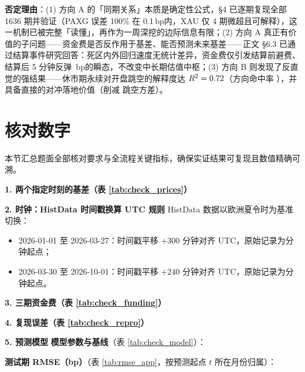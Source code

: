 \documentclass[UTF8,zihao=5,a4paper]{ctexart}
\newcommand{\key}[1]{\textbf{#1}}
\newcommand{\bp}{\ensuremath{\,\mathrm{bp}}}
\begin{document}
{\noindent\textbf{否定理由}：(1) 方向 A 的「同期关系」本质是确定性公式，§4 已逐期复现全部 1636 期并验证（PAXG 误差 100\% 在 0.1\bp 内，XAU 仅 4 期微超且可解释），这一机制已被完整「读懂」，再作为一周深挖的边际信息有限；(2) 方向 A 真正有价值的子问题——资金费是否反作用于基差、能否预测未来基差——正文 §6.3 已通过结算事件研究回答：死区内外回归速度无统计差异，资金费仅引发结算前避费、结算后 5 分钟反弹 \evUpJump\bp 的瞬态，不改变中长期估值中枢；(3) 方向 B 则发现了反直觉的强结果——休市期永续对开盘跳空的解释度达 $R^2=0.72$（方向命中率 \clWkPosthit），并具备直接的对冲落地价值（削减 \clVarCut 跳空方差）。
}

\clearpage
{\linespread{1.08}\selectfont
\setlength{\parskip}{3pt plus 0.6pt minus 0.5pt}
\section{核对数字}
本节汇总题面全部核对要求与全流程关键指标，确保实证结果可复现且数值精确可溯。

\key{1. 两个指定时刻的基差（表 \ref{tab:check_prices}）}
\begin{table}[H]\centering\normalsize
\renewcommand{\arraystretch}{1.32}
\caption{指定时间点收盘价与基差核对}\label{tab:check_prices}

\end{table}

\key{2. 时钟：HistData 时间戳换算 UTC 规则}
HistData 数据以欧洲夏令时为基准切换：
\begin{itemize}[leftmargin=1.5em,itemsep=3pt]
\item 2026-01-01 至 2026-03-27：时间戳平移 $+300$ 分钟对齐 UTC，原始记录为分钟起点；
\item 2026-03-30 至 2026-10-01：时间戳平移 $+240$ 分钟对齐 UTC，原始记录为分钟起点。
\end{itemize}

\key{3. 三期资金费（表 \ref{tab:check_funding}）}
\begin{table}[H]\centering\normalsize
\renewcommand{\arraystretch}{1.32}
\caption{指定结算期资金费率复现对比}\label{tab:check_funding}

\end{table}

\key{4. 复现误差（表 \ref{tab:check_repro}）}
\begin{table}[H]\centering\normalsize
\renewcommand{\arraystretch}{1.32}
\caption{全周期资金费复现误差}\label{tab:check_repro}

\end{table}

\key{5. 预测模型}
\noindent\textbf{模型参数与基线}（表 \ref{tab:check_model}）：
\begin{table}[H]\centering\normalsize
\renewcommand{\arraystretch}{1.32}
\caption{训练/测试样本数与基线回归参数}\label{tab:check_model}

\end{table}
\noindent\textbf{测试期 RMSE（bp）}（表 \ref{tab:rmse_app}，按预测起点 $t$ 所在月份归属）：
\begin{table}[H]\centering\normalsize
\renewcommand{\arraystretch}{1.32}
\caption{测试期零/基线/我的模型三个预测的 RMSE}\label{tab:rmse_app}

\end{table}
}
\end{document}
